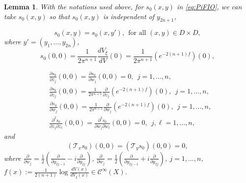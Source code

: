 \documentclass[12pt]{amsart}
\newtheorem{lemma}[theorem]{Lemma}
\theoremstyle{definition}
\theoremstyle{named}
\numberwithin{equation}{subsection}
\newcommand{\ol}{\overline}
\newcommand{\pr}{\partial}
\def\cC{\mathscr{C}}
\begin{document}
\begin{lemma}
With the notations used above, for $s_0(x,y)$ in \eqref{eq:PiFIO}, we
can take $s_0(x,y)$ so that $s_0(x,y)$ is independent of $y_{2n+1}$, 

\begin{equation}\label{e-gue241128yyd}
s_0(x,y)=s_0(x,y'),\ \ \mbox{for all $(x,y)\in D\times D$},
\end{equation}
where $y'=(y_1,\ldots,y_{2n})$,
\begin{equation}\label{e-gue241120yydg}
s_0(0,0)=\frac{1}{2\pi^{n+1}}\frac{dV_\xi}{dV}(0)=\frac{1}{2\pi^{n+1}}(e^{-2(n+1)f})(0),
\end{equation}

\begin{equation}\label{e-gue241120yydu}
\begin{split}
&\frac{\pr s_0}{\pr\ol z_j}(0,0)=\frac{\pr s_0}{\pr w_j}(0,0)=0,\ \ j=1,\ldots,n,\\
&\frac{\pr s_0}{\pr z_j}(0,0)=\frac{1}{2\pi^{n+1}}\frac{\pr}{\pr z_j}(e^{-2(n+1)f})(0),\ \ j=1,\ldots,n,\\
&\frac{\pr s_0}{\pr\ol w_j}(0,0)=\frac{1}{2\pi^{n+1}}\frac{\pr}{\pr\ol w_j}(e^{-2(n+1)f})(0),\ \ j=1,\ldots,n,\\
&\frac{\pr^2s_0}{\pr\ol z_j\pr z_\ell}(0,0)=\frac{\pr^2s_0}{\pr\ol w_j\pr w_\ell}(0,0)=0,\ \ j, \ell=1,\ldots,n,
\end{split}
\end{equation}
and 
\begin{equation}\label{e-gue241125ycd}
(\mathcal{T}_xs_0)(0,0)=(\mathcal{T}_ys_0)(0,0)=0,
\end{equation}
where $\frac{\pr}{\pr w_j}=\frac{1}{2}(\frac{\pr}{\pr y_{2j-1}}-i\frac{\pr}{\pr y_{2j}})$, $\frac{\pr}{\pr\ol w_j}=\frac{1}{2}(\frac{\pr}{\pr y_{2j-1}}+i\frac{\pr}{\pr y_{2j}})$, $j=1,\ldots,n$, $f(x):=\frac{1}{2(n+1)}\log \frac{dV(x)}{dV_\xi(x)}\in\cC^\infty(X)$. 
\end{lemma}
\end{document}
